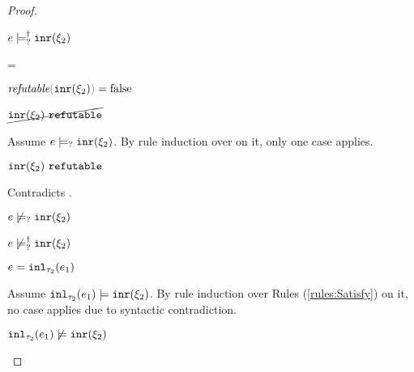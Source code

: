 \begin{proof}
\begin{byCases}
\begin{byCases}
\begin{byCases}
\begin{pfsteps*}
            \item $e \models_{?}^{\dag} \mathtt{inr}(\xi_2)$ 
            \end{pfsteps*}
        \item[\frefutable{\cinr{\xi_2}}=\false]
            \begin{pfsteps*}
            \item $\frefutable{\cinr{\xi_2}}=\false$  
            \item $\cancel{\mathtt{inr}(\xi_2) ~\mathtt{refutable}}$  
            \end{pfsteps*}
            Assume $e \models_{?} \mathtt{inr}(\xi_2)$. By rule induction over  on it, only one case applies.
            \begin{byCases}
            \item[\text{(\ref{rule:CMSNotVal})}]
                \begin{pfsteps*}
                \item $\mathtt{inr}(\xi_2) ~\mathtt{refutable}$ 
                \end{pfsteps*}
                Contradicts .
            \end{byCases}
            \begin{pfsteps*}
            \item $e \not\models_{?} \mathtt{inr}(\xi_2)$  
            \item $e \not\models_{?}^{\dag} \mathtt{inr}(\xi_2)$ 
            \end{pfsteps*}
        \end{byCases}
    \item[\text{(\ref{rule:TInl})}]
        \begin{pfsteps*}
        \item $e=\mathtt{inl}_{\tau_2}({e_1})$ 
        \end{pfsteps*}
        Assume $\mathtt{inl}_{\tau_2}({e_1}) \models \mathtt{inr}(\xi_2)$. By rule induction over Rules (\ref{rules:Satisfy}) on it, no case applies due to syntactic contradiction.
        \begin{pfsteps*}
        \item $\mathtt{inl}_{\tau_2}({e_1}) \not\models \mathtt{inr}(\xi_2)$  

\end{pfsteps*}
\end{byCases}
\end{byCases}
\end{proof}
